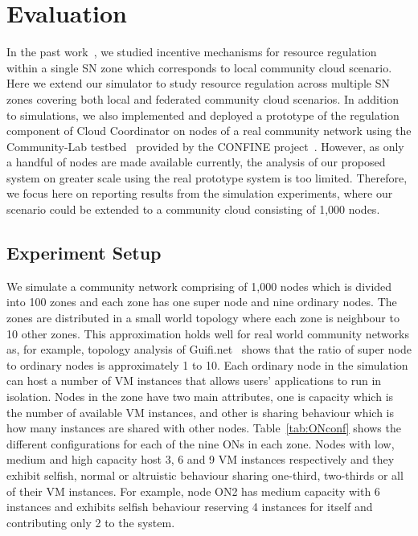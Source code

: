 


\section{Evaluation}
\label{sec:evaluation}

In the past work~\cite{Buyksahin2013}, we studied incentive mechanisms for resource regulation within a single SN zone which corresponds to local community cloud scenario.
Here we extend our simulator to study resource regulation across multiple SN zones covering both local and federated community cloud scenarios.
In addition to simulations, we also implemented and deployed a prototype of the regulation component of Cloud Coordinator on nodes of a real community network using the Community-Lab testbed~\cite{Neumann2012} provided by the CONFINE project~\cite{Braem2013}.
However, as only a handful of nodes are made available currently, the analysis of our proposed system on greater scale using the real prototype system is too limited.
Therefore, we focus here on reporting results from the simulation experiments, where our scenario could be extended to a community cloud consisting of 1,000 nodes.

\subsection{Experiment Setup}
We simulate a community network comprising of 1,000 nodes which is divided into 100 zones and each zone has one super node and nine ordinary nodes.
The zones are distributed in a small world topology where each zone is neighbour to 10 other zones.
This approximation holds well for real world community networks as, for example, topology analysis of Guifi.net~\cite{Vega2012} shows that the ratio of super node to ordinary nodes is approximately 1 to 10. 
Each ordinary node in the simulation can host a number of VM instances that allows users' applications to run in isolation.
Nodes in the zone have two main attributes, one is capacity which is the number of available VM instances, and other is sharing behaviour which is how many instances are shared with other nodes.
Table~\ref{tab:ONconf} shows the different configurations for each of the nine ONs in each zone.
Nodes with low, medium and high capacity host 3, 6 and 9  VM instances respectively and they exhibit selfish, normal or altruistic behaviour sharing one-third, two-thirds or all of their VM instances.
For example, node ON2 has medium capacity with 6 instances and exhibits selfish behaviour reserving 4 instances for itself and contributing only 2 to the system.     

